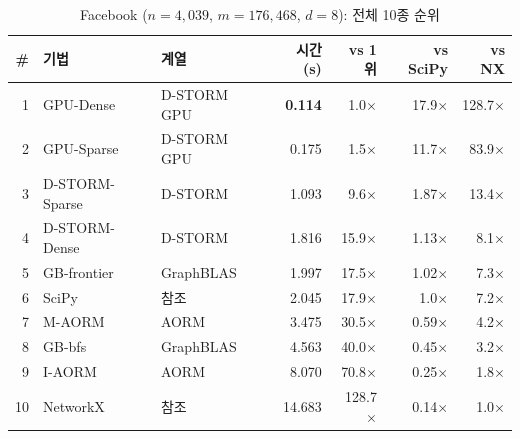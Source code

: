 \documentclass[11pt,a4paper]{article}
\begin{document}
\begin{table}[H]\centering
\caption{Facebook ($n\!=\!4{,}039$, $m\!=\!176{,}468$, $d\!=\!8$): 전체 10종 순위}
\label{tab:fb-all}
\small
\begin{tabular}{@{}rllrrrr@{}}
\toprule
\textbf{\#} & \textbf{기법} & \textbf{계열} & \textbf{시간 (s)} & \textbf{vs 1위} & \textbf{vs SciPy} & \textbf{vs NX} \\
\midrule
\rowcolor{gpucol!10} 1 & GPU-Dense & D-STORM GPU & \textbf{0.114} & 1.0$\times$ & 17.9$\times$ & 128.7$\times$ \\
\rowcolor{gpucol!8} 2 & GPU-Sparse & D-STORM GPU & 0.175 & 1.5$\times$ & 11.7$\times$ & 83.9$\times$ \\
\rowcolor{cpubest!8} 3 & D-STORM-Sparse & D-STORM & 1.093 & 9.6$\times$ & 1.87$\times$ & 13.4$\times$ \\
4 & D-STORM-Dense & D-STORM & 1.816 & 15.9$\times$ & 1.13$\times$ & 8.1$\times$ \\
5 & GB-frontier & GraphBLAS & 1.997 & 17.5$\times$ & 1.02$\times$ & 7.3$\times$ \\
6 & SciPy & 참조 & 2.045 & 17.9$\times$ & 1.0$\times$ & 7.2$\times$ \\
7 & M-AORM & AORM & 3.475 & 30.5$\times$ & 0.59$\times$ & 4.2$\times$ \\
8 & GB-bfs & GraphBLAS & 4.563 & 40.0$\times$ & 0.45$\times$ & 3.2$\times$ \\
9 & I-AORM & AORM & 8.070 & 70.8$\times$ & 0.25$\times$ & 1.8$\times$ \\
10 & NetworkX & 참조 & 14.683 & 128.7$\times$ & 0.14$\times$ & 1.0$\times$ \\
\bottomrule
\end{tabular}
\end{table}
\end{document}
